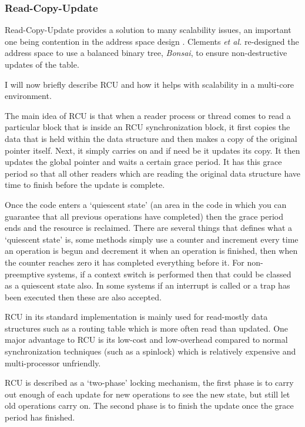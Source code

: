 \documentclass[journal]{IEEEtran}
\begin{document}
\subsubsection{Read-Copy-Update}
Read-Copy-Update provides a solution to many scalability issues, an important one being contention in the address space design \cite{Bonsai}. Clements \emph{et al.} re-designed the address space to use a balanced binary tree, \emph{Bonsai}, to ensure non-destructive updates of the table.

I will now briefly describe RCU and how it helps with scalability in a multi-core environment.

The main idea of RCU is that when a reader process or thread comes to read a particular block that is inside an RCU synchronization block, it first copies the data that is held within the data structure and then makes a copy of the original pointer itself. Next, it simply carries on and if need be it updates its copy. It then updates the global pointer and waits a certain grace period. It has this grace period so that all other readers which are reading the original data structure have time to finish before the update is complete. 

Once the code enters a `quiescent state' (an area in the code in which you can guarantee that all previous operations have completed) then the grace period ends and the resource is reclaimed. There are several things that defines what a `quiescent state' is, some methods simply use a counter and increment every time an operation is begun and decrement it when an operation is finished, then when the counter reaches zero it has completed everything before it. For non-preemptive systems, if a context switch is performed then that could be classed as a quiescent state also. In some systems if an interrupt is called or a trap has been executed then these are also accepted.

RCU in its standard implementation is mainly used for read-mostly data structures such as a routing table which is more often read than updated. One major advantage to RCU is its low-cost and low-overhead compared to normal synchronization techniques (such as a spinlock) which is relatively expensive and multi-processor unfriendly.

RCU is described as a `two-phase' locking mechanism, the first phase is to carry out enough of each update for new operations to see the new state, but still let old operations carry on. The second phase is to finish the update once the grace period has finished.
\end{document}
